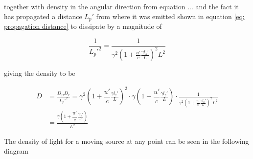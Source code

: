 together with density in the angular direction from equation ... and the fact it has propagated a distance $L_p'$ from where it was emitted shown in equation \eqref{eq: propagation distance} to dissipate by a magnitude of

\begin{equation}
	\frac{1}{L_p'^2} = \frac{1}{\gamma^2 \left( 1 + \frac{u'}{c} \frac{\gamma l_z'}{L} \right)^2 L^2}
\end{equation}

giving the density to be

\begin{equation}
	\begin{aligned}
		D &= \frac{D_\Omega D_r}{L_p'^2} =  {\gamma}^2\left(1 + \dfrac{u'}{c}\frac{\gamma l_z'}{L}\right)^2 \cdot {\gamma}\left(1 + \dfrac{u'}{c}\frac{\gamma l_z'}{L}\right) \cdot \frac{1}{\gamma^2 \left( 1 + \frac{u'}{c} \frac{\gamma l_z'}{L} \right)^2 L^2} \\
		&= \frac{{\gamma}\left(1 + \dfrac{u'}{c}\frac{\gamma l_z'}{L}\right)}{L^2}
	\end{aligned}
\end{equation}

The density of light for a moving source at any point can be seen in the following diagram


